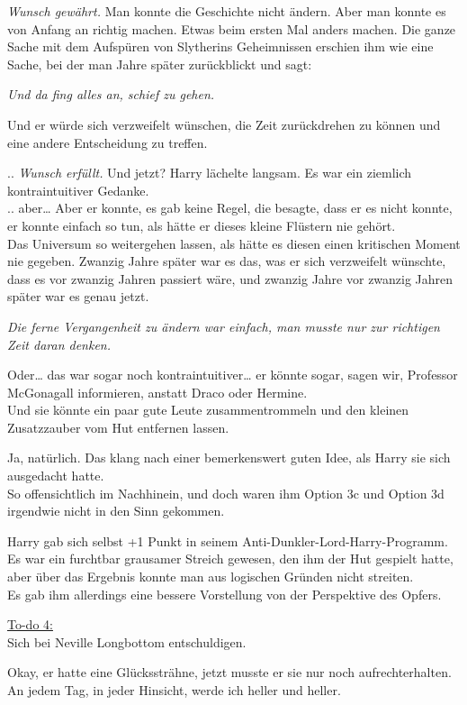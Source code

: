 {\emph{Wunsch gewährt.} Man konnte die Geschichte nicht ändern. Aber man konnte es von Anfang an richtig machen. Etwas beim ersten Mal anders machen. Die ganze Sache mit dem Aufspüren von Slytherins Geheimnissen erschien ihm wie eine Sache, bei der man Jahre später zurückblickt und sagt:

\emph{Und da fing alles an, schief zu gehen.}

Und er würde sich verzweifelt wünschen, die Zeit zurückdrehen zu können und eine andere Entscheidung zu treffen.

.. \emph{Wunsch erfüllt.} Und jetzt? Harry lächelte langsam. Es war ein ziemlich kontraintuitiver Gedanke.\\ .. aber… Aber er konnte, es gab keine Regel, die besagte, dass er es nicht konnte, er konnte einfach so tun, als hätte er dieses kleine Flüstern nie gehört.\\ Das Universum so weitergehen lassen, als hätte es diesen einen kritischen Moment nie gegeben. Zwanzig Jahre später war es das, was er sich verzweifelt wünschte, dass es vor zwanzig Jahren passiert wäre, und zwanzig Jahre vor zwanzig Jahren später war es genau jetzt.

\emph{Die ferne Vergangenheit zu ändern war einfach, man musste nur zur richtigen Zeit daran denken.}

Oder… das war sogar noch kontraintuitiver… er könnte sogar, sagen wir, Professor McGonagall informieren, anstatt Draco oder Hermine.\\ Und sie könnte ein paar gute Leute zusammentrommeln und den kleinen Zusatzzauber vom Hut entfernen lassen.

Ja, natürlich. Das klang nach einer bemerkenswert guten Idee, als Harry sie sich ausgedacht hatte.\\ So offensichtlich im Nachhinein, und doch waren ihm Option 3c und Option 3d irgendwie nicht in den Sinn gekommen.

Harry gab sich selbst +1 Punkt in seinem Anti-Dunkler-Lord-Harry-Programm. Es war ein furchtbar grausamer Streich gewesen, den ihm der Hut gespielt hatte, aber über das Ergebnis konnte man aus logischen Gründen nicht streiten.\\ Es gab ihm allerdings eine bessere Vorstellung von der Perspektive des Opfers.

\uline{To-do 4:}\\ Sich bei Neville Longbottom entschuldigen.

Okay, er hatte eine Glückssträhne, jetzt musste er sie nur noch aufrechterhalten. An jedem Tag, in jeder Hinsicht, werde ich heller und heller.

}
